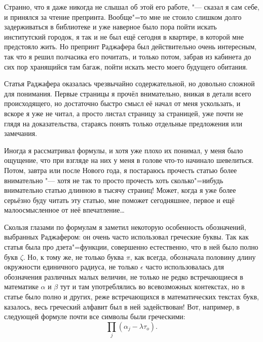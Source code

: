 Странно, что я даже никогда не слышал об этой его работе, "--- сказал я сам
себе, и принялся за чтение препринта.
Вообще"=то мне не стоило слишком долго задерживаться в библиотеке и уже наверное
было пора пойти искать институтский городок, я так и не был ещё сегодня в
квартире, в которой мне предстояло жить.
Но препринт Раджафера был действительно очень интересным, так что я решил
полчасика его почитать, и только потом, забрав из кабинета до сих пор хранящийся
там багаж, пойти искать место моего будущего обитания.

Статья Раджафера оказалась чрезвычайно содержательной, но довольно сложной для
понимания.
Первые страницы я прочёл внимательно, вникая в детали всего происходящего, но
достаточно быстро смысл её начал от меня ускользать, и вскоре я уже не читал, а
просто листал страницу за страницей, уже почти не глядя на доказательства,
стараясь понять только отдельные предложения или замечания.

Иногда я рассматривал формулы, и хотя уже плохо их понимал, у меня было ощущение,
что при взгляде на них у меня в голове что-то начинало шевелиться.
Потом, завтра или после Нового года, я постараюсь прочесть статью более
внимательно "--- хотя не так то просто прочесть хоть сколько"=нибудь внимательно
статью длинною в тысячу страниц!
Может, когда я уже более серьёзно буду читать эту статью, мне поможет
сегодняшнее, первое и ещё малоосмысленное от неё впечатление\ldots

Скользя глазами по формулам я заметил некоторую особенность обозначений,
выбранных Раджафером: он очень часто использовал греческие буквы.
Так как статья была про дзета"=функции, совершенно естественно, что в ней было
полно букв $\zeta$.
Но, к тому же, не только буква $\pi$, как всегда, обозначала половину длину
окружности единичного радиуса, не только $\epsilon$ часто использовалась для
обозначения различных малых величин, не только не редко встречающиеся в
математике $\alpha$ и $\beta$ тут и там употреблялись во всевозможных контекстах,
но в статье было полно и других, реже встречающихся в математических текстах
букв, казалось, весь греческий алфавит был в ней задействован!
Вот, например, в следующей формуле почти все символы были греческими:
\begin{equation*}
\prod_j\left(\alpha_j - \lambda\tau_o\right).
\end{equation*}

